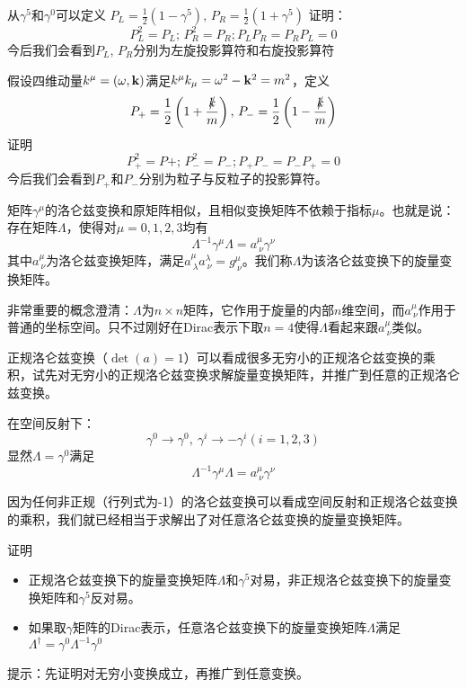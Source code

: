 \documentclass[CJK]{beamer}
\begin{document}
\begin{frame}
\bch
从$\gamma^5$和$\gamma^0$可以定义
$P_L = \frac{1}{2}\left(1-\gamma^5\right),\, P_R = \frac{1}{2}\left(1+\gamma^5\right)$
证明：
$$P_L^2 = P_L;\, P_R^2 = P_R; P_LP_R = P_R P_L=0$$
今后我们会看到$P_L$, $P_R$分别为左旋投影算符和右旋投影算符

\skipline
假设四维动量$k^\mu = (\omega, {\mathbf{k}})$满足$k^\mu k_\mu = \omega^2 - {\mathbf{k}}^2 = m^2$，定义
$$P_+ = \frac{1}{2}\left(1+ \frac{\slashed{k}}{m}\right),\, P_- = \frac{1}{2}\left(1- \frac{\slashed{k}}{m}\right)$$
证明
$$P_+^2 = P+;\, P_-^2 = P_-; P_+P_- = P_-P_+ = 0$$
今后我们会看到$P_+$和$P_-$分别为粒子与反粒子的投影算符。
\ech
\end{frame}

\begin{frame}
\bch
矩阵$\gamma^\mu$的洛仑兹变换和原矩阵相似，且相似变换矩阵不依赖于指标$\mu$。也就是说：存在矩阵$\Lambda$，使得对$\mu=0,1,2,3$均有
$$\Lambda^{-1}\gamma^\mu\Lambda = a^\mu_{\ \nu} \gamma^\nu$$
其中$a^\mu_{\ \nu}$为洛仑兹变换矩阵，满足$a^\mu_{\ \lambda} a^\lambda_{\ \nu} = g^\mu_{\ \nu}$。我们称$\Lambda$为该洛仑兹变换下的旋量变换矩阵。

\skipline
非常重要的概念澄清：$\Lambda$为$n\times n$矩阵，它作用于旋量的内部$n$维空间，而$a^\mu_{\ \nu}$作用于普通的坐标空间。只不过刚好在Dirac表示下取$n=4$使得$\Lambda$看起来跟$a^\mu_{\ \nu}$类似。


\skipline
正规洛仑兹变换（$\det(a) = 1$）可以看成很多无穷小的正规洛仑兹变换的乘积，试先对无穷小的正规洛仑兹变换求解旋量变换矩阵，并推广到任意的正规洛仑兹变换。

\ech
\end{frame}



\begin{frame}
\bch
在空间反射下：
$$\gamma^0 \rightarrow \gamma^0,\  \gamma^i\rightarrow -\gamma^i (i=1,2,3)$$
显然$\Lambda = \gamma^0$满足
$$\Lambda^{-1}\gamma^\mu \Lambda = a^\mu_{\ \nu}\gamma^\nu$$



\skipline

因为任何非正规（行列式为-1）的洛仑兹变换可以看成空间反射和正规洛仑兹变换的乘积，我们就已经相当于求解出了对任意洛仑兹变换的旋量变换矩阵。

\ech

\end{frame}


\begin{frame}
\bch
证明
\begin{itemize}
\item{正规洛仑兹变换下的旋量变换矩阵$\Lambda$和$\gamma^5$对易，非正规洛仑兹变换下的旋量变换矩阵和$\gamma^5$反对易。}
\item{如果取$\gamma$矩阵的Dirac表示，任意洛仑兹变换下的旋量变换矩阵$\Lambda$满足$\Lambda^\dagger = \gamma^0 \Lambda^{-1}\gamma^0$}
\end{itemize}

\skipline

提示：先证明对无穷小变换成立，再推广到任意变换。
\ech
\end{frame}
\end{document}
